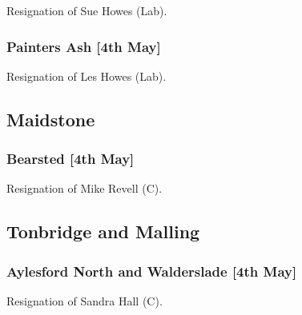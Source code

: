 \documentclass[a4paper,openany]{book}
\begin{document}
\begin{resultsiii}

Resignation of Sue Howes (Lab).

\subsubsection*{Painters Ash \hspace*{\fill}\nolinebreak[1]%
\enspace\hspace*{\fill}
[4th May]}


Resignation of Les Howes (Lab).

\subsection*{Maidstone}

\subsubsection*{Bearsted \hspace*{\fill}\nolinebreak[1]%
\enspace\hspace*{\fill}
[4th May]}


Resignation of Mike Revell (C).

\subsection*{Tonbridge and Malling}

\subsubsection*{Aylesford North and Walderslade \hspace*{\fill}\nolinebreak[1]%
\enspace\hspace*{\fill}
[4th May]}


Resignation of Sandra Hall (C).

\section[Lancashire]{}


\end{resultsiii}
\end{document}
